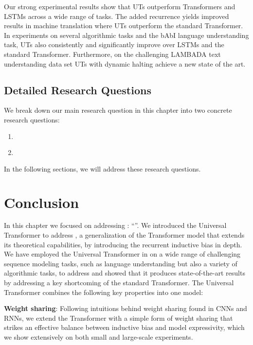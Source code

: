 Our strong experimental results show that UTs outperform Transformers and LSTMs across a wide range of tasks. The added recurrence yields improved results in machine translation where UTs outperform the standard Transformer. In experiments on several algorithmic tasks and the bAbI language understanding task, UTs also consistently and significantly improve over LSTMs and the standard Transformer. Furthermore, on the challenging LAMBADA text understanding data set UTs with dynamic halting achieve a new state of the art.

\subsection{Detailed Research Questions}
We break down our main research question in this chapter into two concrete research questions:
\begin{resqbox}
\begin{enumerate}
\item[\textbf{\resqname{c6.1}}] \emph{}
\item[\textbf{\resqname{c6.2}}] \emph{}
\end{enumerate}
\end{resqbox}

In the following sections, we will address these research questions.




\section{Conclusion}
In this chapter we focused on addressing \textbf{}: ``\emph{}''.
We introduced the Universal Transformer to address \textbf{}, a generalization of the Transformer model that extends its theoretical capabilities, by introducing the recurrent inductive bias in depth. 
We have employed the Universal Transformer in on a wide range of challenging sequence modeling tasks, such as language understanding but also a variety of algorithmic tasks, to address \textbf{} and showed that it produces state-of-the-art results by addressing a key shortcoming of the standard Transformer. The Universal Transformer combines the following key properties into one model:

\textbf{Weight sharing}: Following intuitions behind weight sharing found in CNNs and RNNs, we extend the Transformer with a simple form of weight sharing that strikes an effective balance between inductive bias and model expressivity, which we show extensively on both small and large-scale experiments.

